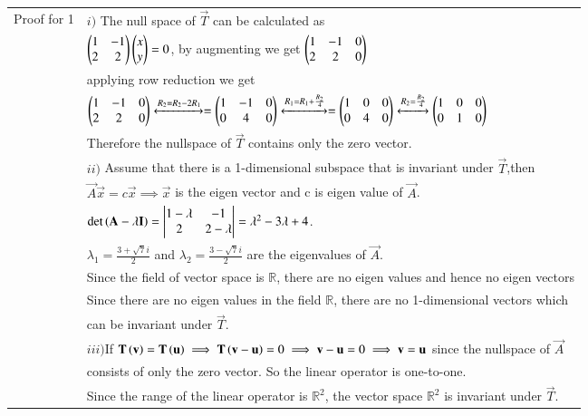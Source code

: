 \begin{longtable}{|l|l|}
    \hline
    Proof for 1  & $i)$  The null space of $\vec{T}$ can be calculated as\\
   & \quad $\begin{pmatrix}1&-1\\2&2\end{pmatrix}\begin{pmatrix}x\\y\end{pmatrix}=0$, by augmenting we get $\begin{pmatrix}1&-1&0\\2&2&0\end{pmatrix}$ \\
   &\quad applying row reduction we get\\
   &\quad $\begin{pmatrix}1&-1&0\\2&2&0\end{pmatrix}\xleftrightarrow{R_2=R_2-2R_1}=\begin{pmatrix}1&-1&0\\0&4&0\end{pmatrix}\xleftrightarrow{R_1=R_1+\frac{R_2}{4}}=\begin{pmatrix}1&0&0\\0&4&0\end{pmatrix}\xleftrightarrow{R_2=\frac{R_2}{4}}\begin{pmatrix}1&0&0\\0&1&0\end{pmatrix}$\\
   &\quad Therefore the nullspace of $\vec{T}$ contains only the zero vector.\\
   &$ii)$ Assume that there is a 1-dimensional subspace that is invariant under $\vec{T}$,then \\
   &\quad $\vec{A}\vec{x}=c\vec{x}\implies\vec{x}$ is the eigen vector and c is eigen value of $\vec{A}$.\\
    & \qquad  \qquad \qquad \qquad $\det \left(\mathbf{A}-\lambda \mathbf{I}\right)=\begin{vmatrix}1-\lambda&-1\\2&2-\lambda\end{vmatrix}=\lambda^2-3\lambda+4$.\\
    &\qquad  \qquad \qquad \qquad $\lambda_1=\frac{3+\sqrt{7}i}{2}$ and $\lambda_2=\frac{3-\sqrt{7}i}{2}$ are the eigenvalues of $\vec{A}$.\\
   &\quad Since the field of vector space is $\mathbb{R}$, there are no eigen values and hence no eigen vectors\\
   &\quad Since there are no eigen values in the field $\mathbb{R}$, there are no 1-dimensional vectors which\\
   &\quad can be invariant under $\vec{T}$.\\
   &$iii)$If $\mathbf{T}\left(\mathbf{v}\right)=\mathbf{T}\left(\mathbf{u}\right)\implies \mathbf{T}\left(\mathbf{v-u}\right)=0\implies \mathbf{v-u}=0\implies \mathbf{v}=\mathbf{u}$ since the nullspace of $\vec{A}$\\
   & \quad consists of only the zero vector. So the linear operator is one-to-one.\\
   &Since the range of the linear operator is $\mathbb{R}^2$, the vector space $\mathbb{R}^2$ is invariant under $\vec{T}$.\\

\end{longtable}
